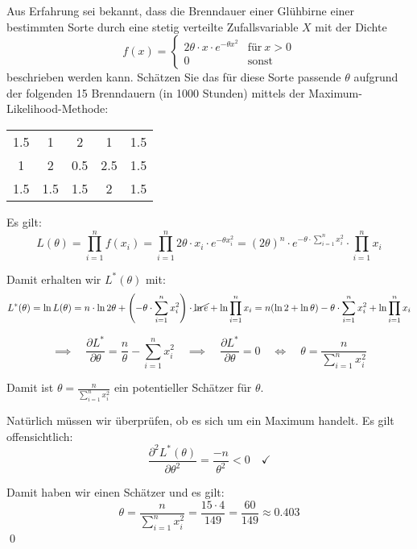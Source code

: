 \documentclass{abgabe}
\begin{document}
\begin{questions}
    \question
    Aus Erfahrung sei bekannt, dass die Brenndauer einer Glühbirne einer bestimmten Sorte durch eine stetig verteilte Zufallsvariable $X$ mit der Dichte
    \[
        f(x) =
        \begin{cases}
            2\theta \cdot x \cdot e^{-\theta x^2} & \text{für} \ x > 0 \\
            0                                     & \text{sonst}
        \end{cases}
    \]
    beschrieben werden kann.
    Schätzen Sie das für diese Sorte passende $\theta$ aufgrund der folgenden 15 Brenndauern (in 1000 Stunden) mittels der Maximum-Likelihood-Methode:

    \begin{center}
        \begin{tabular}{CCCCC}
            1.5 & 1   & 2   & 1   & 1.5 \\
            1   & 2   & 0.5 & 2.5 & 1.5 \\
            1.5 & 1.5 & 1.5 & 2   & 1.5
        \end{tabular}
    \end{center}

    \begin{solution}
        Es gilt:
        \[
            L(\theta) = \prod_{i=1}^{n} f(x_i) = \prod_{i=1}^{n} 2\theta \cdot x_i \cdot e^{-\theta x_i^2} = (2 \theta)^n \cdot e^{-\theta \cdot \sum_{i=1}^{n} x_i^2}  \cdot \prod_{i=1}^{n} x_i
        \]

        Damit erhalten wir $L^*(\theta)$ mit:
        \[
            L^*(\theta) = \ln L(\theta) = n \cdot \ln 2\theta + \left( -\theta \cdot \sum_{i=1}^{n} x_i^2 \right) \cdot \cancel{\ln e} + \ln \prod_{i=1}^{n} x_i = n (\ln 2 + \ln \theta) - \theta \cdot \sum_{i=1}^{n} x_i^2 + \ln \prod_{i=1}^{n} x_i
        \]

        \[
            \implies \quad \frac{\partial L^*}{\partial \theta} = \frac{n}{\theta} - \sum_{i=1}^{n} x_i^2 \quad \implies \quad \frac{\partial L^*}{\partial \theta} = 0 \quad \iff \quad \theta = \frac{n}{\sum_{i=1}^{n} x_i^2}
        \]

        Damit ist $\theta = \frac{n}{\sum_{i=1}^{n} x_i^2}$ ein potentieller Schätzer für $\theta$.

        Natürlich müssen wir überprüfen, ob es sich um ein Maximum handelt.
        Es gilt offensichtlich:
        \[
            \frac{\partial^2 L^*(\theta)}{\partial \theta^2} = \frac{-n}{\theta^2} < 0 \quad \checkmark
        \]

        Damit haben wir einen Schätzer und es gilt:
        \[
            \theta = \frac{n}{\sum_{i=1}^{n} x_i^2} = \frac{15 \cdot 4}{149} = \frac{60}{149} \approx 0.403
        \]
        \qed
    \end{solution}
\end{questions}
\end{document}
